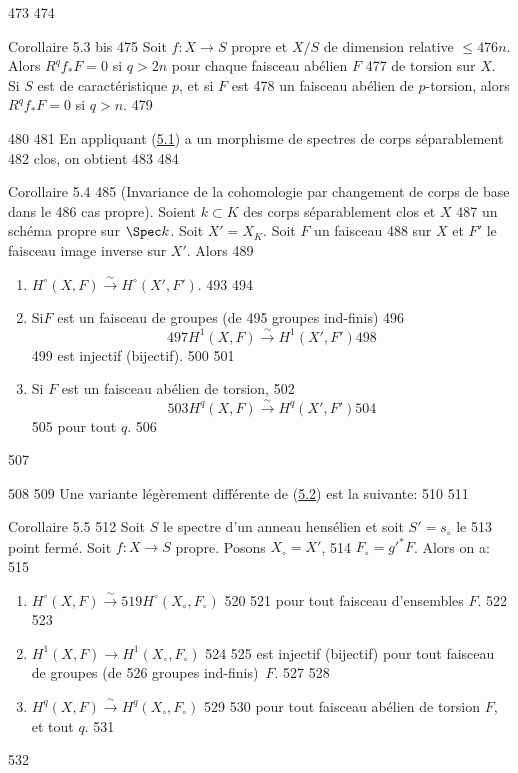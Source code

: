    473	
   474	\begin{enonce*}{Corollaire 5.3 bis}
   475	Soit $f:X\rightarrow S$ propre et $X/S$ de dimension relative $\leq
   476	n$. Alors $R^qf_{\ast}F=0$ si $q>2n$ pour chaque faisceau abélien $F$
   477	de torsion sur $X$. Si $S$ est de caractéristique $p$, et si $F$ est
   478	un faisceau abélien de $p$-torsion, alors $R^qf_{\ast}F=0$ si $q>n$.
   479	\end{enonce*}
   480	
   481	En appliquant (\hyperref[XII.thm5.1]{5.1}) a un morphisme de spectres de corps séparablement
   482	clos, on obtient
   483	
   484	\begin{enonce*}{Corollaire 5.4}
   485	(Invariance de la cohomologie par changement de corps de base dans le
   486	  cas propre). Soient $k\subset K$ des corps séparablement clos et $X$
   487	  un schéma propre sur $\Spec k$. Soit $X'=X_K$. Soit $F$ un faisceau
   488	  sur $X$ et $F'$ le faisceau image inverse sur $X'$. Alors
   489	\begin{enumerate}
   490	\renewcommand{\theenumi}{\roman{enumi}}
   491	\renewcommand{\labelenumi}{(\theenumi)}
   492	\item $H^{\circ}(X,F)\xrightarrow{\sim} H^{\circ}(X',F')$.
   493	
   494	\item Si\pageoriginale $F$ est un faisceau de groupes (\resp de
   495	  groupes ind-finis)
   496	$$
   497	H^1(X,F)\xrightarrow{\sim} H^1(X',F')
   498	$$
   499	est injectif (\resp bijectif).
   500	
   501	\item Si $F$ est un faisceau abélien de torsion,
   502	$$
   503	H^q(X,F)\xrightarrow{\sim} H^q(X',F')
   504	$$
   505	pour tout $q$.
   506	\end{enumerate}
   507	\end{enonce*}
   508	
   509	Une variante légèrement différente de (\hyperref[XII.cor5.2]{5.2}) est la suivante:
   510	
   511	\begin{enonce*}{Corollaire 5.5}
   512	Soit $S$ le spectre d'un anneau hensélien et soit $S'=s_{\circ}$ le
   513	point fermé. Soit $f:X\rightarrow S$ propre. Posons $X_{\circ}=X'$,
   514	$F_{\circ}={g'}^{\ast}F$. Alors on a:
   515	\begin{enumerate}
   516	\renewcommand{\theenumi}{\roman{enumi}}
   517	\renewcommand{\labelenumi}{(\theenumi)}
   518	\item $H^{\circ}(X,F)\xrightarrow{\sim}
   519	  H^{\circ}(X_{\circ},F_{\circ})$
   520	
   521	pour tout faisceau d'ensembles $F$.
   522	
   523	\item $H^1(X,F)\rightarrow H^1(X_{\circ},F_{\circ})$
   524	
   525	est injectif (\resp bijectif) pour tout faisceau de groupes (\resp de
   526	groupes ind-finis)~$F$.
   527	
   528	\item $H^q(X,F)\xrightarrow{\sim} H^q(X_{\circ},F_{\circ})$
   529	
   530	pour tout faisceau abélien de torsion $F$, et tout $q$.
   531	\end{enumerate}
   532	\end{enonce*}
